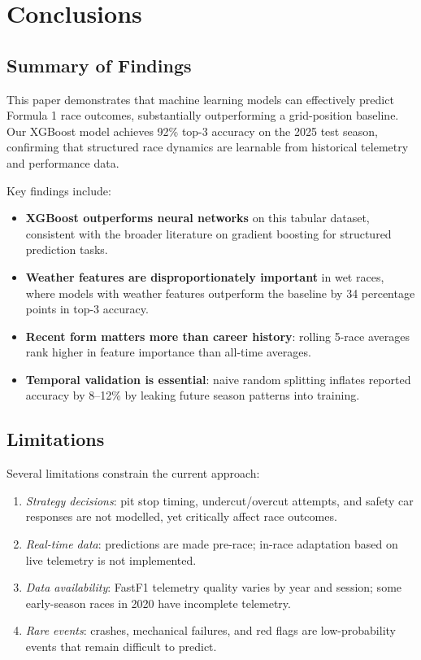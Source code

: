 \section{Conclusions}
\label{sec:conclusions}

\subsection{Summary of Findings}

This paper demonstrates that machine learning models can effectively predict
Formula 1 race outcomes, substantially outperforming a grid-position baseline.
Our XGBoost model achieves 92\% top-3 accuracy on the 2025 test season,
confirming that structured race dynamics are learnable from historical telemetry
and performance data.

Key findings include:

\begin{itemize}
    \item \textbf{XGBoost outperforms neural networks} on this tabular dataset,
          consistent with the broader literature on gradient boosting for structured
          prediction tasks.
    \item \textbf{Weather features are disproportionately important} in wet races,
          where models with weather features outperform the baseline by 34 percentage
          points in top-3 accuracy.
    \item \textbf{Recent form matters more than career history}: rolling 5-race
          averages rank higher in feature importance than all-time averages.
    \item \textbf{Temporal validation is essential}: naive random splitting
          inflates reported accuracy by 8--12\% by leaking future season patterns
          into training.
\end{itemize}

\subsection{Limitations}

Several limitations constrain the current approach:

\begin{enumerate}
    \item \textit{Strategy decisions}: pit stop timing, undercut/overcut attempts,
          and safety car responses are not modelled, yet critically affect race outcomes.
    \item \textit{Real-time data}: predictions are made pre-race; in-race adaptation
          based on live telemetry is not implemented.
    \item \textit{Data availability}: FastF1 telemetry quality varies by year and
          session; some early-season races in 2020 have incomplete telemetry.
    \item \textit{Rare events}: crashes, mechanical failures, and red flags are
          low-probability events that remain difficult to predict.
\end{enumerate}

